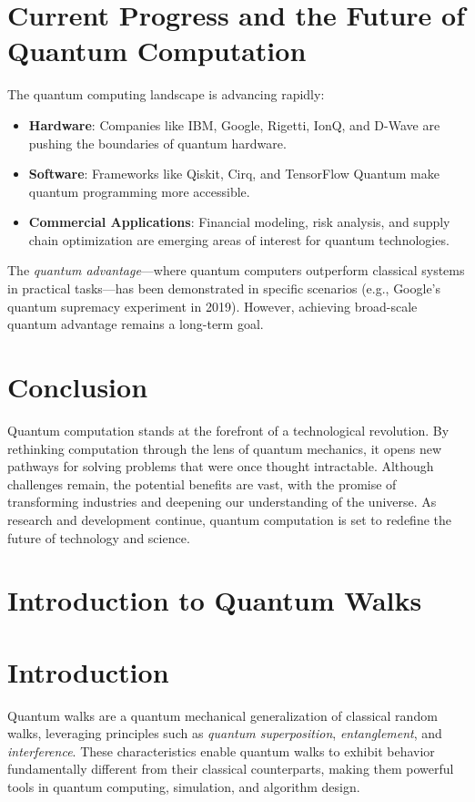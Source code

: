 \documentclass[11pt]{article}
\theoremstyle{definition}
\begin{document}
\section*{Current Progress and the Future of Quantum Computation}
The quantum computing landscape is advancing rapidly:
\begin{itemize}
    \item \textbf{Hardware}: Companies like IBM, Google, Rigetti, IonQ, and D-Wave are pushing the boundaries of quantum hardware.
    \item \textbf{Software}: Frameworks like Qiskit, Cirq, and TensorFlow Quantum make quantum programming more accessible.
    \item \textbf{Commercial Applications}: Financial modeling, risk analysis, and supply chain optimization are emerging areas of interest for quantum technologies.
\end{itemize}
The \textit{quantum advantage}---where quantum computers outperform classical systems in practical tasks---has been demonstrated in specific scenarios (e.g., Google's quantum supremacy experiment in 2019). However, achieving broad-scale quantum advantage remains a long-term goal.

\section*{Conclusion}
Quantum computation stands at the forefront of a technological revolution. By rethinking computation through the lens of quantum mechanics, it opens new pathways for solving problems that were once thought intractable. Although challenges remain, the potential benefits are vast, with the promise of transforming industries and deepening our understanding of the universe. As research and development continue, quantum computation is set to redefine the future of technology and science.




\section{Introduction to Quantum Walks}


\section*{Introduction}
Quantum walks are a quantum mechanical generalization of classical random walks, leveraging principles such as \textit{quantum superposition}, \textit{entanglement}, and \textit{interference}. These characteristics enable quantum walks to exhibit behavior fundamentally different from their classical counterparts, making them powerful tools in quantum computing, simulation, and algorithm design.
\end{document}
